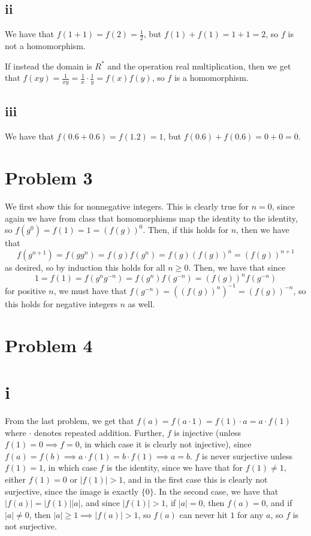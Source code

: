 \documentclass[12pt,letterpaper]{article}
\theoremstyle{definition}
\begin{document}
\subsection*{ii}

We have that $f(1 + 1) = f(2) = \frac{1}{2}$, but $f(1) + f(1) = 1 + 1 = 2$, so $f$ is not a homomorphism.

If instead the domain is $R^*$ and the operation real multiplication, then we get that $f(xy) = \frac{1}{xy} = \frac{1}{x} \cdot \frac{1}{y} = f(x)f(y)$, so $f$ is a homomorphism.

\subsection*{iii}

We have that $f(0.6 + 0.6) = f(1.2) = 1$, but $f(0.6) + f(0.6) = 0 + 0 = 0$.

\section*{Problem 3}

We first show this for nonnegative integers. This is clearly true for $n = 0$, since again we have from class that homomorphisms map the identity to the identity, so $f(g^0) = f(1) = 1 = (f(g))^0$. Then, if this holds for $n$, then we have that
\[
  f(g^{n+1}) = f(gg^n) = f(g)f(g^n) = f(g)(f(g))^n = (f(g))^{n+1}
\]
as desired, so by induction this holds for all $n \geq 0$. Then, we have that since
\[
  1 = f(1) = f(g^n g^{-n}) = f(g^n)f(g^{-n}) = (f(g))^nf(g^{-n})
\]
for positive $n$, we must have that $f(g^{-n}) = ((f(g))^n)^{-1} = (f(g))^{-n}$, so this holds for negative integers $n$ as well.

\section*{Problem 4}

\section*{i}

From the last problem, we get that $f(a) = f(a \cdot 1) = f(1) \cdot a = a \cdot f(1)$ where $\cdot$ denotes repeated addition. Further, $f$ is injective (unless $f(1) = 0 \implies f = 0$, in which case it is clearly not injective), since  $f(a) = f(b) \implies a \cdot f(1) = b \cdot f(1) \implies a = b$. $f$ is never surjective unless $f(1) = 1$, in which case $f$ is the identity, since we have that for $f(1) \neq 1$, either $f(1) = 0$ or $|f(1)| > 1$, and in the first case this is clearly not surjective, since the image is exactly $\{0\}$. In the second case, we have that $|f(a)| = |f(1)||a|$, and since $|f(1)| > 1$, if $|a| = 0$, then $f(a) = 0$, and if $|a| \neq 0$, then $|a| \geq 1 \implies |f(a)| > 1$, so $f(a)$ can never hit $1$ for any $a$, so $f$ is not surjective.
\end{document}
